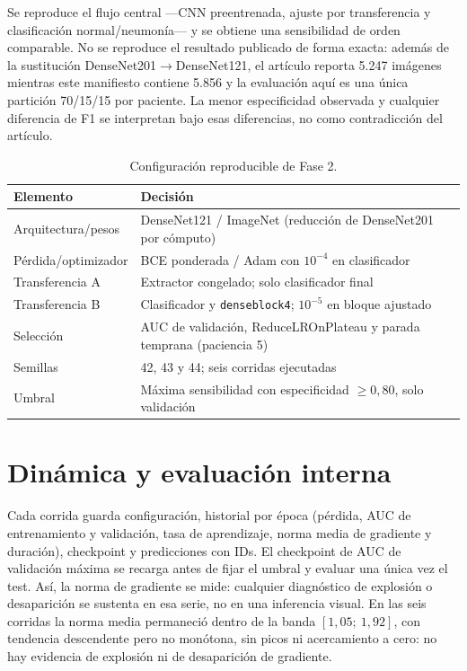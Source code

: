\documentclass[11pt]{article}
\begin{document}
Se reproduce el flujo central ---CNN preentrenada, ajuste por transferencia y clasificación normal/neumonía--- y se obtiene una sensibilidad de orden comparable. No se reproduce el resultado publicado de forma exacta: además de la sustitución DenseNet201$\rightarrow$DenseNet121, el artículo reporta 5.247 imágenes mientras este manifiesto contiene 5.856 y la evaluación aquí es una única partición 70/15/15 por paciente. La menor especificidad observada y cualquier diferencia de F1 se interpretan bajo esas diferencias, no como contradicción del artículo.

\begin{table}[h]\centering\small
\caption{Configuración reproducible de Fase 2.}\label{tab:config}
\begin{tabular}{ll}\toprule
Elemento & Decisión \\\midrule
Arquitectura/pesos & DenseNet121 / ImageNet (reducción de DenseNet201 por cómputo)\\
Pérdida/optimizador & BCE ponderada / Adam con $10^{-4}$ en clasificador\\
Transferencia A & Extractor congelado; solo clasificador final\\
Transferencia B & Clasificador y \texttt{denseblock4}; $10^{-5}$ en bloque ajustado\\
Selección & AUC de validación, ReduceLROnPlateau y parada temprana (paciencia 5)\\
Semillas & 42, 43 y 44; seis corridas ejecutadas\\
Umbral & Máxima sensibilidad con especificidad $\geq0,80$, solo validación\\\bottomrule
\end{tabular}
\end{table}

\section{Dinámica y evaluación interna}
Cada corrida guarda configuración, historial por época (pérdida, AUC de entrenamiento y validación, tasa de aprendizaje, norma media de gradiente y duración), checkpoint y predicciones con IDs. El checkpoint de AUC de validación máxima se recarga antes de fijar el umbral y evaluar una única vez el test. Así, la norma de gradiente se mide: cualquier diagnóstico de explosión o desaparición se sustenta en esa serie, no en una inferencia visual. En las seis corridas la norma media permaneció dentro de la banda $[1{,}05;\ 1{,}92]$, con tendencia descendente pero no monótona, sin picos ni acercamiento a cero: no hay evidencia de explosión ni de desaparición de gradiente.
\end{document}
